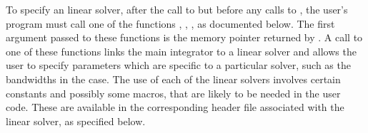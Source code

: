 To specify an {\ida} linear solver, after the call to 
but before any calls to , the user's program must call one
of the functions , , ,
as documented below. The first argument passed to these functions is the {\ida}
memory pointer returned by .  A call to one of these
functions links the main {\ida} integrator to a linear solver and
allows the user to specify parameters which are specific to a
particular solver, such as the bandwidths in the {\idaband} case.
The use of each of the linear solvers involves certain constants and possibly 
some macros, that are likely to be needed in the user code.  These are
available in the corresponding header file associated with the linear
solver, as specified below.


